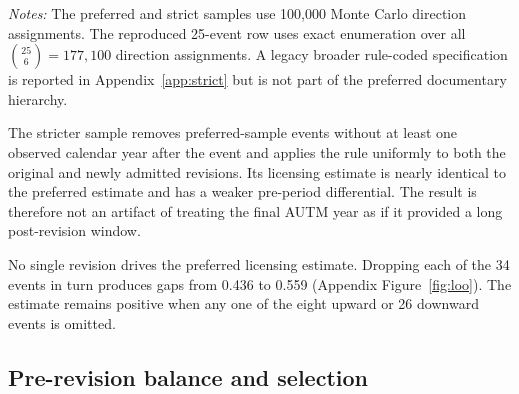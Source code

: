 \begin{table}[htbp]\centering
\caption{Alternative documentary event samples: licensing and filing margin}\label{tab:robust}
\footnotesize
{}
\vspace{2pt}

\parbox{0.94\textwidth}{\footnotesize\textit{Notes:} The preferred and strict samples use 100,000 Monte Carlo direction assignments. The reproduced 25-event row uses exact enumeration over all $\binom{25}{6}=177{,}100$ direction assignments. A legacy broader rule-coded specification is reported in Appendix~\ref{app:strict} but is not part of the preferred documentary hierarchy.}
\end{table}

The stricter sample removes preferred-sample events without at least one observed calendar year after the event and applies the rule uniformly to both the original and newly admitted revisions. Its licensing estimate is nearly identical to the preferred estimate and has a weaker pre-period differential. The result is therefore not an artifact of treating the final AUTM year as if it provided a long post-revision window.

No single revision drives the preferred licensing estimate. Dropping each of the 34 events in turn produces gaps from 0.436 to 0.559 (Appendix Figure~\ref{fig:loo}). The estimate remains positive when any one of the eight upward or 26 downward events is omitted.

\subsection*{Pre-revision balance and selection}

